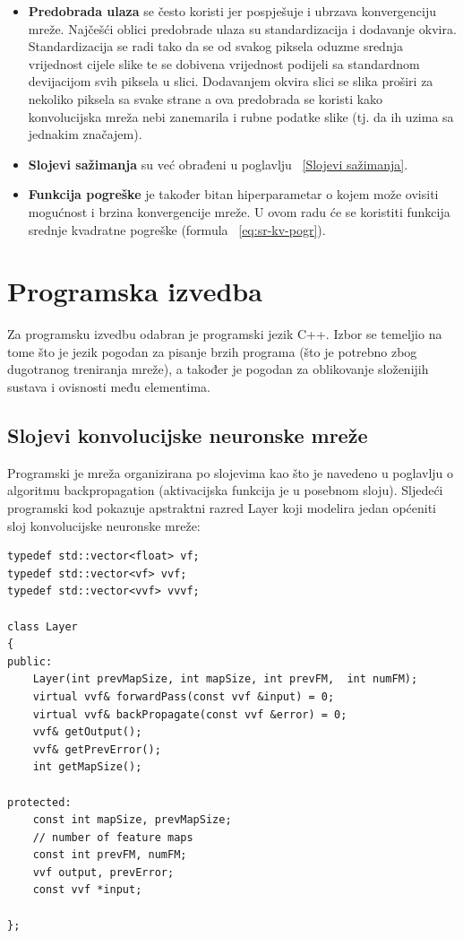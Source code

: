 \documentclass[times, utf8, zavrsni, numeric]{fer}
\begin{document}
\begin{itemize}
\item \textbf{Predobrada ulaza} se često koristi jer pospješuje i ubrzava konvergenciju mreže. Najčešći oblici predobrade ulaza su standardizacija i dodavanje okvira. Standardizacija se radi tako da se od svakog piksela oduzme srednja vrijednost cijele slike te se dobivena vrijednost podijeli sa standardnom devijacijom svih piksela u slici. Dodavanjem okvira slici se slika proširi za nekoliko piksela sa svake strane a ova predobrada se koristi kako konvolucijska mreža nebi zanemarila i rubne podatke slike (tj. da ih uzima sa jednakim značajem).

\item \textbf{Slojevi sažimanja} su već obrađeni u poglavlju ~\ref{Slojevi sažimanja}.

\item \textbf{Funkcija pogreške} je također bitan hiperparametar o kojem može ovisiti mogućnost i brzina konvergencije mreže. U ovom radu će se koristiti funkcija srednje kvadratne pogreške (formula ~\ref{eq:sr-kv-pogr}).

\end{itemize}

\chapter{Programska izvedba}
Za programsku izvedbu odabran je programski jezik C++. Izbor se temeljio na tome što je jezik pogodan za pisanje brzih programa (što je potrebno zbog dugotranog treniranja mreže), a također je pogodan za oblikovanje složenijih sustava i ovisnosti među elementima. 

\section{Slojevi konvolucijske neuronske mreže}
Programski je mreža organizirana po slojevima kao što je navedeno u poglavlju o algoritmu backpropagation (aktivacijska funkcija je u posebnom sloju). Sljedeći programski kod pokazuje apstraktni razred Layer koji modelira jedan općeniti sloj konvolucijske neuronske mreže:

\renewcommand{\lstlistingname}{Programski kod}
\begin{lstlisting}[caption=Razred Layer,
  label=Layer]
typedef std::vector<float> vf;
typedef std::vector<vf> vvf;
typedef std::vector<vvf> vvvf;

class Layer
{
public:
    Layer(int prevMapSize, int mapSize, int prevFM,  int numFM);
    virtual vvf& forwardPass(const vvf &input) = 0;
    virtual vvf& backPropagate(const vvf &error) = 0;
    vvf& getOutput();
    vvf& getPrevError();
    int getMapSize();

protected:
    const int mapSize, prevMapSize;
    // number of feature maps
    const int prevFM, numFM;
    vvf output, prevError;
    const vvf *input;

};
\end{lstlisting}
\end{document}
